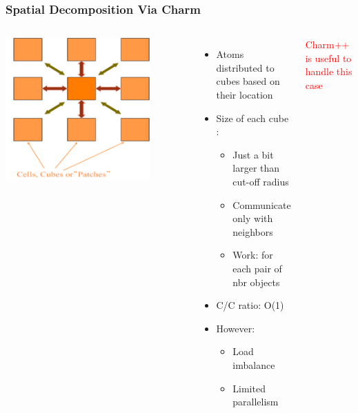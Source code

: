 \begin{frame}[t]
\frametitle{Spatial Decomposition Via Charm}
  \begin{columns}
  \begin{center} \includegraphics[width=0.8\textwidth]{figures/namd_decomp.pdf} \end{center}
  \begin{itemize}
    \item Atoms distributed to cubes based on their location
    \pause
    \item Size of each cube :
    \begin{itemize}
      \item Just a bit larger than cut-off radius
      \item Communicate only with neighbors
      \item Work: for each pair of nbr objects
    \end{itemize}
    \item C/C ratio: O(1)
    \pause
    \item However: 
    \begin{itemize}
      \item Load imbalance
      \item Limited parallelism
    \end{itemize}
  \end{itemize}
  \pause
  \textcolor{red}{Charm++ is useful to handle this case}
  \end{columns}
\end{frame}

